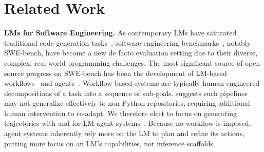 \section{Related Work}
\label{sec:related}
\textbf{LMs for Software Engineering.} As contemporary LMs have saturated traditional code generation tasks~\citep{austin_program_2021,chen_evaluating_2021}, software engineering benchmarks~\citep{jain2024r2e,jimenez_swe-bench_2024,yang_swe-bench_2024,zhao_commit0_2024,zan2025multiswebenchmultilingualbenchmarkissue}, notably SWE-bench, have become a new de facto evaluation setting due to their diverse, complex, real-world programming challenges.
The most significant source of open source progress on SWE-bench has been the development of LM-based workflows~\citep{orwall2024moatless,xia_agentless_2024,zhang_autocoderover_2024} and agents~\citep{antoniades_swe-search_2024,wang_openhands_2024,yang_swe-agent_2024,zhang_diversity_2024}.
Workflow-based systems are typically human-engineered decompositions of a task into a sequence of sub-goals.
\citet{yang_swe-bench_2024} suggests such pipelines may not generalize effectively to non-Python repositories, requiring additional human intervention to re-adapt.
We therefore elect to focus on generating trajectories with and for LM agent systems~\citep{sumers2024cognitivearchitectureslanguageagents,yang_intercode_2023,yao_react_2023}.
Because no workflow is imposed, agent systems inherently rely more on the LM to plan and refine its actions, putting more focus on an LM's capabilities, not inference scaffolds.


